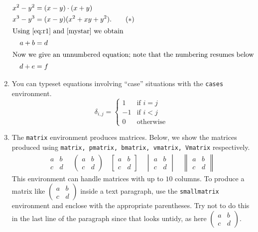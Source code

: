 \begin{enumerate}
\begin{align}
x^2 -y^2 &= (x-y)\cdot(x+y) \label{eq:r1} \\
x^3 -y^3 & = (x-y)(x^2 +xy + y^2). \tag{$*$} \label{mystar}\\
\intertext{Using \eqref{eq:r1} and \eqref{mystar} we obtain}
a + b &= d  \\
\intertext{Now we give an unnumbered equation; note that the numbering resumes below}
d+ e & = f \notag
\end{align}
\item You can typeset equations involving ``case'' situations with the {\tt cases}
environment.
\begin{equation}
\delta_{i,j} = \begin{cases}
	1 & \text{if $i =j$} \\
	-1 & \text{if $i<j$} \\
	0 & \text{otherwise}
	\end{cases}
\end{equation}
\item The {\tt matrix} environment produces matrices. Below, we show the 
matrices produced using {\tt matrix, pmatrix, bmatrix, vmatrix, Vmatrix} respectively.
\begin{gather*}
\begin{matrix} a & b \\ c & d \end{matrix} \quad
\begin{pmatrix} a & b \\ c & d \end{pmatrix} \quad 
\begin{bmatrix} a & b \\ c & d \end{bmatrix} \quad
\begin{vmatrix} a & b \\ c & d \end{vmatrix} \quad
\begin{Vmatrix} a & b \\ c & d \end{Vmatrix}
\end{gather*}
This environment can handle matrices with up to $10$ columns.
To produce a matrix like 
$\left( \begin{smallmatrix} a & b \\ c& d \end{smallmatrix} \right)$ 
inside a text
paragraph, use the {\tt smallmatrix} environment and enclose with the appropriate
parentheses. Try not to do this in the last line of the paragraph since that looks
untidy, as here $\left( \begin{smallmatrix} a & b \\ c& d \end{smallmatrix} \right)$.


\end{enumerate}
